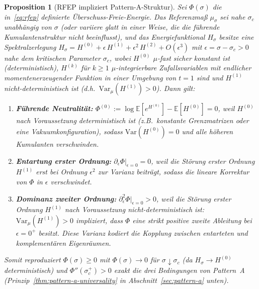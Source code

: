 \documentclass[12pt,a4paper]{article}
\newtheorem{proposition}[theorem]{Proposition}
\theoremstyle{definition}
\theoremstyle{remark}
\newcommand{\EE}{\mathbb{E}}
\begin{document}
\begin{proposition}[RFEP impliziert Pattern-A-Struktur]
\label{prop:rfep-to-pattern-a}
Sei $\Phi(\sigma)$ die in~\eqref{eq:rfep} definierte Überschuss-Freie-Energie. Das Referenzmaß $\mu_\sigma$ sei nahe $\sigma_c$ unabhängig von $\sigma$ \textup{(}oder variiere glatt in einer Weise, die die führende Kumulantenstruktur nicht beeinflusst\textup{)}, und das Energiefunktional $H_\sigma$ besitze eine Spektralzerlegung $H_\sigma = H^{(0)} + \epsilon\, H^{(1)} + \epsilon^2\, H^{(2)} + O(\epsilon^{3})$ mit $\epsilon = \sigma - \sigma_c > 0$ nahe dem kritischen Parameter $\sigma_c$, wobei $H^{(0)}$ $\mu$-fast sicher konstant ist \textup{(}deterministisch\textup{)}, $H^{(k)}$ für $k \ge 1$ $\mu$-integrierbare Zufallsvariablen mit endlicher momentenerzeugender Funktion in einer Umgebung von $t = 1$ sind und $H^{(1)}$ nicht-deterministisch ist \textup{(}d.h.\ $\mathrm{Var}_\mu(H^{(1)}) > 0$\textup{)}. Dann gilt:
\begin{enumerate}[label=\textup{(\roman*)}]
    \item \textbf{Führende Neutralität:} $\Phi^{(0)} := \log \EE[e^{H^{(0)}}] - \EE[H^{(0)}] = 0$, weil $H^{(0)}$ nach Voraussetzung deterministisch ist (z.B.\ konstante Grenzmatrizen oder eine Vakuumkonfiguration), sodass $\mathrm{Var}(H^{(0)}) = 0$ und alle höheren Kumulanten verschwinden.
    \item \textbf{Entartung erster Ordnung:} $\partial_\epsilon \Phi|_{\epsilon=0} = 0$, weil die Störung erster Ordnung $H^{(1)}$ erst bei Ordnung $\epsilon^2$ zur Varianz beiträgt, sodass die lineare Korrektur von $\Phi$ in $\epsilon$ verschwindet.
    \item \textbf{Dominanz zweiter Ordnung:} $\partial^2_\epsilon \Phi|_{\epsilon=0} > 0$, weil die Störung erster Ordnung $H^{(1)}$ nach Voraussetzung nicht-deterministisch ist: $\mathrm{Var}_{\mu}(H^{(1)}) > 0$ impliziert, dass $\Phi$ eine strikt positive zweite Ableitung bei $\epsilon = 0^+$ besitzt. Diese Varianz kodiert die Kopplung zwischen entarteten und komplementären Eigenräumen.
\end{enumerate}
Somit reproduziert $\Phi(\sigma) \ge 0$ mit $\Phi(\sigma) \to 0$ für $\sigma \downarrow \sigma_c$ (da $H_\sigma \to H^{(0)}$ deterministisch) und $\Phi''(\sigma_c^+) > 0$ exakt die drei Bedingungen von Pattern~A (Prinzip~\ref{thm:pattern-a-universality} in Abschnitt~\ref{sec:pattern-a} unten).
\end{proposition}
\end{document}
